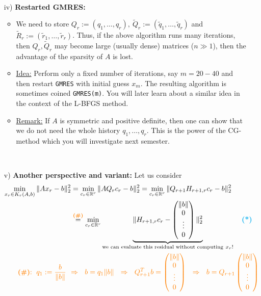 \begin{frame}
	~\\
	\begin{itemize}
		\item [iv)] \textbf{Restarted GMRES:}
		\begin{itemize}
			\item We need to store $Q_r:=(q_1,\dots,q_r),~\widetilde{Q}_r:=(\widetilde{q}_1,\dots,\widetilde{q}_r)$ and $\widetilde{R}_r:=(\widetilde{r}_1,\dots,\widetilde{r}_r)$. Thus, if the above algorithm runs many iterations, then $Q_r,\widetilde{Q}_r$ may become large (usually dense) matrices ($n\gg 1$), then the advantage of the sparsity of $A$ is lost.
			\item \underline{Idea:}	Perform only a fixed number of iterations, say $m=20-40$ and then restart \texttt{GMRES} with initial guess $x_m$. The resulting algorithm is sometimes coined \texttt{GMRES(m)}. You will later learn about a similar idea in the context of the L-BFGS method.
			\item \underline{Remark:} If $A$ is symmetric and positive definite, then one can show that we do not need the whole history $q_1,\dots,q_r$. This is the power of the CG-method which you will investigate next semester. 
		\end{itemize}
	~\\
		\item [v)] \textbf{Another perspective and variant:} Let us consider
		\begin{align*}
		\min_{x_r\in K_r(A,b)}\|Ax_r-b\|_2^2&=\min_{c_r\in\mathbb{R}^r}\|AQ_rc_r-b\|_2^2
		=\min_{c_r\in\mathbb{R}^r}\|Q_{r+1}H_{r+1,r}c_r-b\|_2^2\\
		&\stackrel{\textbf{\color{orange}(\#)}}{=}\min_{c_r\in\mathbb{R}^r}\underbrace{\|H_{r+1,r}c_r-\begin{pmatrix}
			\|b\|\\0\\\vdots\\0
			\end{pmatrix}\|_2^2}_{\text{we can evaluate this residual without computing}~x_r !}~~~\textbf{\color{cyan}(*)}\\
	 \textbf{\small\color{orange}(\#)}{\color{orange}:~q_1:=\frac{b}{\|b\|}~~}&{\color{orange}\Rightarrow~~b=q_1\|b\|~~\Rightarrow~~Q_{r+1}^Tb=\begin{pmatrix}
		\|b\|\\0\\\vdots\\0
		\end{pmatrix}~~\Rightarrow~~b=Q_{r+1}\begin{pmatrix}
		\|b\|\\0\\\vdots\\0
		\end{pmatrix} }
		\end{align*}
	\end{itemize}
\end{frame}

